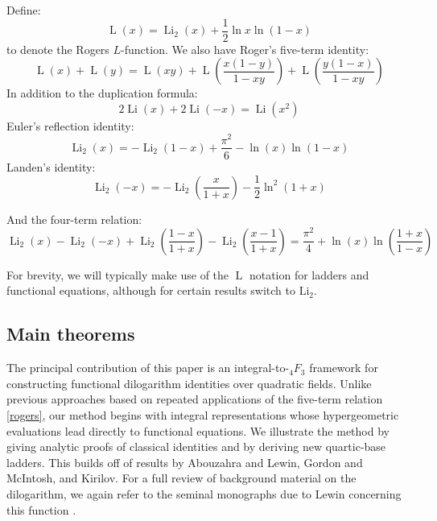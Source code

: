 \documentclass[12pt]{article}
\begin{document}
 \noindent Define: 
\begin{equation}\label{RogersLdefinition}
 \operatorname{L}(x)= \operatorname{Li}_{2}(x) + \frac{1}{2} \ln x \ln(1-x)  
\end{equation}
 to denote the Rogers $L$-function. We also have Roger's five-term identity:
\begin{equation}\label{rogers}
 \operatorname{L}(x) + \operatorname{L}(y) = \operatorname{L}(x y) + 
\operatorname{L}\left( \frac{x(1-y)}{1- x y} \right) + \operatorname{L}\left( \frac{y(1-x)}{1-xy} \right) 
\end{equation} 
In addition to the duplication formula: 
\begin{equation}\label{duplicationformula}
 2 \operatorname{Li}(x) + 2 \operatorname{Li}(-x) = \operatorname{Li}(x^{2}) 
\end{equation}
Euler's reflection identity: 
\begin{equation}\label{Eulerreflectionidentity}
 \operatorname{Li}_2(x) = -\operatorname{Li}_2(1 - x) + \frac{\pi^2}{6} - \ln(x) \ln(1 - x) 
\end{equation}
Landen's  identity: 
\begin{equation}\label{Landenformula}
 \operatorname{Li}_{2}(-x) = -\operatorname{Li}_{2}\left( \frac{x}{1+x} \right) - \frac{1}{2} \ln^2(1+x) 
\end{equation}

\noindent And the four-term relation: 
\begin{equation}\label{wellknown4term}
 \operatorname{Li}_2(x) - \operatorname{Li}_2(-x) + 
 \operatorname{Li}_2\left(\frac{1 - x}{1 + x}\right) - 
 \operatorname{Li}_2\left(\frac{x-1}{1 + x}\right) = \frac{\pi^2}{4} + \ln(x) \ln\left(\frac{1 + x}{1 - x}\right) 
\end{equation}



\remark For brevity, we will typically make use of the $\operatorname{L}$ notation for ladders and functional equations, although for certain results switch to $\operatorname{Li_2}$.

\subsection{Main theorems} 
 The principal contribution of this paper is an
integral-to-${}_4F_3$ framework for constructing functional
dilogarithm identities over quadratic fields. Unlike previous
approaches based on repeated applications of the five-term relation \eqref{rogers},
our method begins with integral representations whose hypergeometric
evaluations lead directly to functional equations. We illustrate the
method by giving analytic proofs of classical identities and by
deriving new quartic-base ladders. This builds off of results by Abouzahra and Lewin, Gordon and McIntosh, and Kirilov. For a full review of background material on the dilogarithm, we again refer to the seminal monographs due to 
 Lewin concerning this function \cite{Lewin1958,Lewin1981,Lewin1991text}. 
\end{document}
